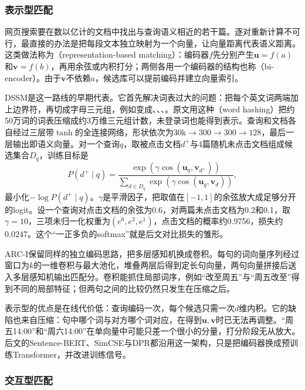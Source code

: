 \subsubsection{表示型匹配}
\label{sec:nlp-classification-representation-matching}

网页搜索要在数以亿计的文档中找出与查询语义相近的若干篇。逐对重新计算不可行，最直接的办法是把每段文本独立映射为一个向量，让向量距离代表语义距离。这类做法称为（representation-based matching）：编码器$f$先分别产生$\bm u=f(a)$和$\bm v=f(b)$，再用余弦或内积打分；两侧各用一个编码器的结构也称（bi-encoder）。由于$\bm v$不依赖$a$，候选库可以提前编码并建立向量索引。

DSSM是这一路线的早期代表。它首先解决词表过大的问题：把每个英文词两端加上边界符，再切成字母三元组，例如变成、、、。原文用这种（word hashing）把约50万词的词表压缩成约3万维三元组计数，未登录词也能得到表示。查询和文档各自经过三层带$\tanh$的全连接网络，形状依次为$30\text{k}\to300\to300\to128$，最后一层输出即语义向量。对一个查询$q$，取被点击文档$d^+$与4篇随机未点击文档组成候选集合$D_q$，训练目标是
\[
  P(d^+\mid q)=\frac{\exp(\gamma\cos(\bm u_q,\bm v_{d^+}))}
  {\sum_{d\in D_q}\exp(\gamma\cos(\bm u_q,\bm v_d))},
\]
最小化$-\log P(d^+\mid q)$。$\gamma$是平滑因子，把取值在$[-1,1]$的余弦放大成足够分开的logit。设一个查询对点击文档的余弦为0.6，对两篇未点击文档为0.2和0.1，取$\gamma=10$，三项未归一化权重为$(e^6,e^2,e^1)$，点击文档的概率约0.9756，损失约0.0247。这个“一正多负的softmax”就是后文对比损失的雏形。

ARC-I保留同样的独立编码思路，把多层感知机换成卷积。每句的词向量序列经过窗口为$k$的一维卷积与最大池化，堆叠两层后得到定长句向量，两句向量拼接后送入多层感知机输出匹配分。卷积能抓住局部词序，例如“改至周五”与“周五改至”得到不同的局部特征；但两句之间的比较仍然只发生在压缩之后。

表示型的优点是在线代价低：查询编码一次，每个候选只需一次$d$维内积。它的缺陷也来自压缩：句中哪个词与对方哪个词对应，在得到$\bm u,\bm v$时已无法再调整。“周五14:00”和“周六14:00”在单向量中可能只差一个很小的分量，打分阶段无从放大。后文的Sentence-BERT、SimCSE与DPR都沿用这一架构，只是把编码器换成预训练Transformer，并改进训练信号。

\subsubsection{交互型匹配}
\label{sec:nlp-classification-interaction-matching}


